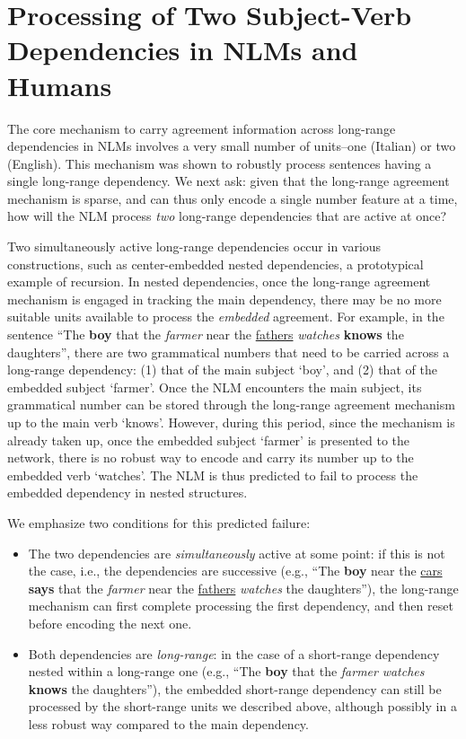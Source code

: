 \section{Processing of Two Subject-Verb Dependencies in NLMs and Humans}
The core mechanism to carry agreement information across long-range dependencies in NLMs involves a very small number of units--one (Italian) or two (English). This mechanism was shown to robustly process sentences having a single long-range dependency. We next ask: given that the long-range agreement mechanism is sparse, and can thus only encode a single number feature at a time, how will the NLM process \emph{two} long-range dependencies that are active at once?

Two simultaneously active long-range dependencies occur in various constructions, such as center-embedded nested dependencies, a prototypical example of recursion. In nested dependencies, once the long-range agreement mechanism is engaged in tracking the main dependency, there may be no more suitable units available to process the \textit{embedded} agreement. For example, in the sentence ``The \textbf{boy} that the \textit{farmer} near the \underline{fathers} \textit{watches} \textbf{knows} the daughters'', there are two grammatical numbers that need to be carried across a long-range dependency: (1) that of the main subject `boy', and (2) that of the embedded subject `farmer'. Once the NLM  encounters the main subject, its grammatical number can be stored through the long-range agreement mechanism up to the main verb `knows'. However, during this period, since the mechanism is already taken up, once the embedded subject `farmer' is presented to the network, there is no robust way to encode and carry its number up to the embedded verb `watches'. The NLM is thus predicted to fail to process the embedded dependency in nested structures.

We emphasize two conditions for this predicted failure:
\begin{itemize}
	\item The two dependencies are \textit{simultaneously} active at some point: if this is not the case, i.e., the dependencies are successive (e.g., ``The \textbf{boy} near the \underline{cars} \textbf{says} that the \textit{farmer} near the \underline{fathers} \textit{watches} the daughters''), the long-range mechanism can first complete processing the first dependency, and then reset before encoding the next one. 

    \item Both dependencies are \textit{long-range}: in the case
          of a short-range dependency nested within a long-range one
          (e.g., ``The \textbf{boy} that the \textit{farmer}
          \textit{watches} \textbf{knows} the daughters''), the
          embedded short-range dependency can still be processed by
          the short-range units we described above, although possibly in a less robust way compared to the main dependency. 
\end{itemize}

